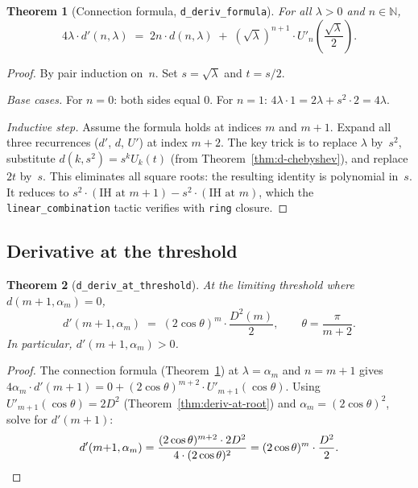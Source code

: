 \documentclass[11pt,a4paper]{article}
\theoremstyle{plain}
\newtheorem{theorem}{Theorem}[section]
\theoremstyle{definition}
\newcommand{\N}{\mathbb{N}}
\newcommand{\Dsq}{D^2}
\newcommand{\alpham}{\alpha_m}
\newcommand{\chebU}{U}
\newcommand{\lean}[1]{\texttt{#1}}
\begin{document}
\begin{theorem}[Connection formula, \lean{d\_deriv\_formula}]
\label{thm:connection}
For all $\lambda > 0$ and $n \in \N$,
\[
  4\lambda \cdot d'(n,\lambda) \;=\;
  2n \cdot d(n,\lambda) \;+\;
  (\sqrt{\lambda})^{n+1} \cdot \chebU'_n\!\left(\frac{\sqrt{\lambda}}{2}\right).
\]
\end{theorem}

\begin{proof}
By pair induction on~$n$.  Set $s = \sqrt\lambda$ and $t = s/2$.

\emph{Base cases.}
For $n=0$: both sides equal $0$.
For $n=1$: $4\lambda \cdot 1 = 2\lambda + s^2 \cdot 2 = 4\lambda$.

\emph{Inductive step.}
Assume the formula holds at indices $m$ and $m{+}1$.  Expand all
three recurrences ($d'$, $d$, $\chebU'$) at index $m{+}2$.
The key trick is to replace $\lambda$ by~$s^2$, substitute
$d(k,s^2) = s^k \chebU_k(t)$
(from Theorem~\ref{thm:d-chebyshev}), and replace $2t$ by~$s$.
This eliminates all square roots: the resulting identity is
polynomial in~$s$.  It reduces to
$s^2 \cdot (\text{IH at } m{+}1) - s^2 \cdot (\text{IH at } m)$,
which the \lean{linear\_combination} tactic verifies
with \lean{ring} closure.
\end{proof}

\subsection{Derivative at the threshold}

\begin{theorem}[\lean{d\_deriv\_at\_threshold}]
\label{thm:d-deriv-threshold}
At the limiting threshold where $d(m{+}1,\alpham) = 0$,
\[
  d'(m{+}1,\alpham) \;=\;
  (2\cos\theta)^m \cdot \frac{\Dsq(m)}{2},
  \qquad \theta = \frac{\pi}{m+2}.
\]
In particular, $d'(m{+}1,\alpham) > 0$.
\end{theorem}

\begin{proof}
The connection formula (Theorem~\ref{thm:connection}) at $\lambda = \alpham$
and $n = m{+}1$ gives
$4\alpham \cdot d'(m{+}1) = 0 + (2\cos\theta)^{m+2} \cdot \chebU'_{m+1}(\cos\theta)$.
Using $\chebU'_{m+1}(\cos\theta) = 2\Dsq$ (Theorem~\ref{thm:deriv-at-root})
and $\alpham = (2\cos\theta)^2$, solve for $d'(m{+}1)$:
\[
  d'(m{+}1,\alpham) = \frac{(2\cos\theta)^{m+2} \cdot 2\Dsq}{4 \cdot (2\cos\theta)^2}
  = (2\cos\theta)^m \cdot \frac{\Dsq}{2}. \qedhere
\]
\end{proof}
\end{document}

